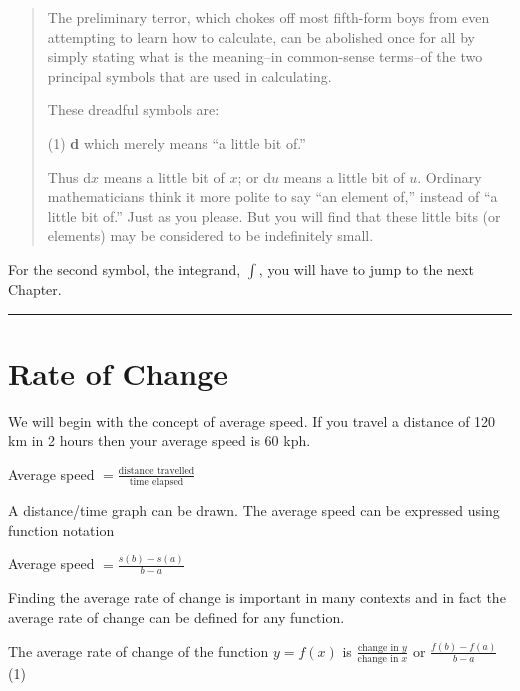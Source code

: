 \begin{quotation}
	The preliminary terror, which chokes off most fifth-form boys from even attempting to learn how to calculate, can be abolished once for all by simply stating what is the meaning–in common-sense terms–of the two principal symbols that are used in calculating.

	These dreadful symbols are:\medskip

	(1) \textbf{d} which merely means “a little bit of.”\medskip

	Thus d$x$ means a little bit of $x$; or d$u$ means a little bit of $u$. Ordinary mathematicians think it more polite to say “an element of,” instead of “a little bit of.” Just as you please. But you will find that these little bits (or elements) may be considered to be indefinitely small.
\end{quotation}

For the second symbol, the integrand, $\int$, you will have to jump to the next Chapter.\\
\rule{\textwidth}{0.4pt}

\section*{Rate of Change}
We will begin with the concept of average speed. If you travel a distance of 120 km in 2 hours then your average speed is 60 kph.
\begin{center}
Average speed $ =\displaystyle\frac{\text{distance travelled}}{\text{time elapsed}}$
\end{center}\par
A distance/time graph can be drawn. The average speed can be expressed using function notation
\begin{center}
Average speed $\displaystyle =\frac{s (b) -s (a)}{b -a}$
\end{center}\par
Finding the average rate of change is important in many contexts and in fact the average rate of change can be defined for any function.

The average rate of change of the function $\displaystyle y =f (x)$ is $\displaystyle\frac{\text{change in }y}{\text{change in }x}$ or $\displaystyle\frac{f (b) -f (a)}{b -a}$\hfill(1)

